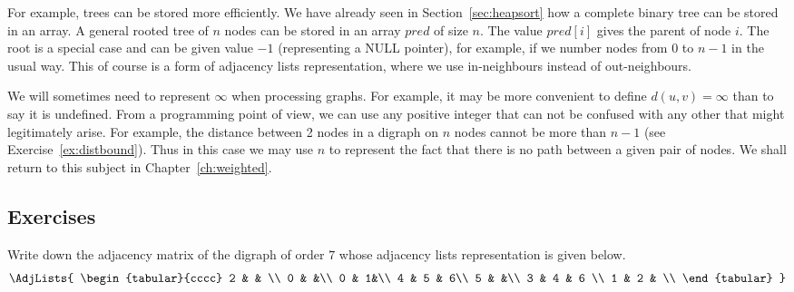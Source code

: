 For example, trees can be stored more efficiently. We have already
seen in Section~\ref{sec:heapsort} how a complete binary tree can be
stored in an array. A general rooted tree of $n$ nodes can be stored in
an array $pred$ of size $n$. The value $pred[i]$ gives the parent of
node $i$. The root is a special case and can be given value $-1$
(representing a NULL pointer), for example, if we number nodes from $0$
to $n-1$ in the usual way. This of course is a form of adjacency lists
representation, where we use in-neighbours instead of out-neighbours.

We will sometimes need to represent $\infty$ when processing graphs. For
example, it may be more convenient to define $d(u, v) = \infty$ than to
say it is undefined. From a programming point of view, we can use any
positive integer that can not be confused with any other that might
legitimately arise. For example, the distance between 2 nodes in a
digraph on $n$ nodes cannot be more than $n - 1$ (see
Exercise~\ref{ex:distbound}). Thus in this case we may use $n$ to
represent the fact that there is no path between a given pair of nodes.
We shall return to this subject in Chapter~\ref{ch:weighted}.

\subsection*{Exercises}

\begin{Exercise}
\label{ex:list2matrix}

Write down the adjacency matrix of the digraph of order $7$ whose 
adjacency lists representation is given below.
\newline
$$
\AdjLists{
\begin{tabular}{cccc}
2 &  & \\
0 & &\\
0 & 1&\\
4 & 5 & 6\\
5 & &\\
3 & 4 & 6 \\
1 & 2 & \\
\end{tabular}
}
$$

\end{Exercise}

